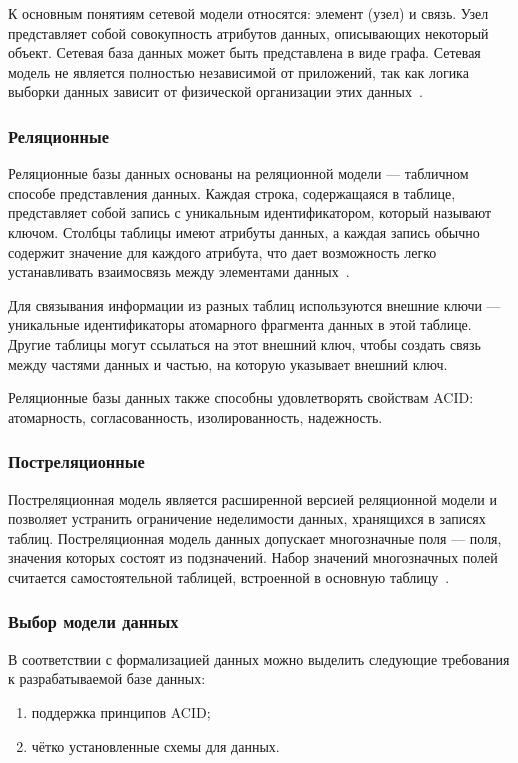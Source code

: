 К основным понятиям сетевой модели относятся: элемент (узел) и связь.
Узел представляет собой совокупность атрибутов данных, описывающих некоторый объект. Сетевая база данных может быть представлена в виде графа. Сетевая модель не является полностью независимой от приложений, так как логика выборки данных зависит от физической организации этих данных~\cite{before2}. 

\subsubsection{Реляционные}
 Реляционные базы данных основаны на реляционной модели --- табличном способе представления данных. Каждая строка, содержащаяся в таблице, представляет собой запись с уникальным идентификатором, который называют ключом. Столбцы таблицы имеют атрибуты данных, а каждая запись обычно содержит значение для каждого атрибута, что дает возможность легко устанавливать взаимосвязь между элементами данных~\cite{rel}.

Для связывания информации из разных таблиц используются внешние ключи --- уникальные идентификаторы атомарного фрагмента данных в этой таблице. Другие таблицы могут ссылаться на этот внешний ключ, чтобы создать связь между частями данных и частью, на которую указывает внешний ключ.

Реляционные базы данных также способны удовлетворять свойствам ACID: атомарность, согласованность, изолированность, надежность.

\subsubsection{Постреляционные}

Постреляционная модель является расширенной версией реляционной модели и позволяет устранить ограничение неделимости данных, хранящихся в записях таблиц. Постреляционная модель данных допускает многозначные поля --- поля, значения которых состоят из подзначений. Набор значений многозначных полей считается самостоятельной таблицей, встроенной в основную таблицу~\cite{after}. 

\subsubsection{Выбор модели данных}

В соответствии с формализацией данных можно выделить следующие требования к разрабатываемой базе данных:

\begin{enumerate}[left=0.49cm, label*=---]
	\item поддержка принципов ACID;
	\item чётко установленные схемы для данных.
\end{enumerate}

